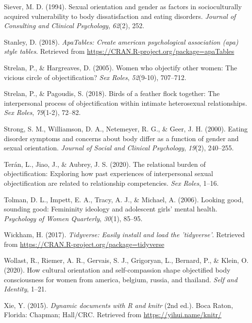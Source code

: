 \documentclass[man]{apa6}
\begin{document}
\hypertarget{ref-siever1994sexual}{}
Siever, M. D. (1994). Sexual orientation and gender as factors in
socioculturally acquired vulnerability to body dissatisfaction and
eating disorders. \emph{Journal of Consulting and Clinical Psychology},
\emph{62}(2), 252.

\hypertarget{ref-R-apaTables}{}
Stanley, D. (2018). \emph{ApaTables: Create american psychological
association (apa) style tables}. Retrieved from
\url{https://CRAN.R-project.org/package=apaTables}

\hypertarget{ref-strelan2005women}{}
Strelan, P., \& Hargreaves, D. (2005). Women who objectify other women:
The vicious circle of objectification? \emph{Sex Roles},
\emph{52}(9-10), 707--712.

\hypertarget{ref-strelan2018birds}{}
Strelan, P., \& Pagoudis, S. (2018). Birds of a feather flock together:
The interpersonal process of objectification within intimate
heterosexual relationships. \emph{Sex Roles}, \emph{79}(1-2), 72--82.

\hypertarget{ref-strong2000eating}{}
Strong, S. M., Williamson, D. A., Netemeyer, R. G., \& Geer, J. H.
(2000). Eating disorder symptoms and concerns about body differ as a
function of gender and sexual orientation. \emph{Journal of Social and
Clinical Psychology}, \emph{19}(2), 240--255.

\hypertarget{ref-teran2020relational}{}
Terán, L., Jiao, J., \& Aubrey, J. S. (2020). The relational burden of
objectification: Exploring how past experiences of interpersonal sexual
objectification are related to relationship competencies. \emph{Sex
Roles}, 1--16.

\hypertarget{ref-tolman2006looking}{}
Tolman, D. L., Impett, E. A., Tracy, A. J., \& Michael, A. (2006).
Looking good, sounding good: Femininity ideology and adolescent girls'
mental health. \emph{Psychology of Women Quarterly}, \emph{30}(1),
85--95.

\hypertarget{ref-R-tidyverse}{}
Wickham, H. (2017). \emph{Tidyverse: Easily install and load the
'tidyverse'}. Retrieved from
\url{https://CRAN.R-project.org/package=tidyverse}

\hypertarget{ref-wollast2020cultural}{}
Wollast, R., Riemer, A. R., Gervais, S. J., Grigoryan, L., Bernard, P.,
\& Klein, O. (2020). How cultural orientation and self-compassion shape
objectified body consciousness for women from america, belgium, russia,
and thailand. \emph{Self and Identity}, 1--21.

\hypertarget{ref-R-knitr}{}
Xie, Y. (2015). \emph{Dynamic documents with R and knitr} (2nd ed.).
Boca Raton, Florida: Chapman; Hall/CRC. Retrieved from
\url{https://yihui.name/knitr/}
\end{document}
